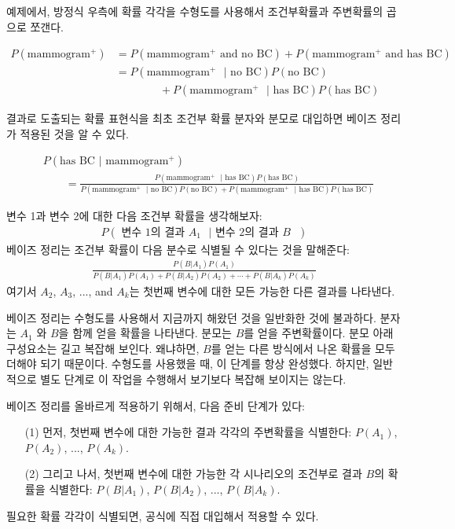 예제에서, 방정식 우측에 확률 각각을 수형도를 사용해서 조건부확률과 주변확률의 곱으로 쪼갠다.

\begin{align*}
P(\text{mammogram$^+$})
	&= P(\text{mammogram$^+$ and no BC}) + P(\text{mammogram$^+$ and has BC}) \\
	&= P(\text{mammogram$^+$ } | \text{ no BC})P(\text{no BC}) \\
			   &\qquad\qquad + P(\text{mammogram$^+$ } | \text{ has BC})P(\text{has BC})
\end{align*}

결과로 도출되는 확률 표현식을 최초 조건부 확률 분자와 분모로 대입하면 베이즈 정리가 적용된 것을 알 수 있다.

\begin{align*}
& P(\text{has BC } | \text{ mammogram$^+$})  \\
& \qquad= \frac{P(\text{mammogram$^+$ } | \text{ has BC})P(\text{has BC})}
	{P(\text{mammogram$^+$ } | \text{ no BC})P(\text{no BC}) + P(\text{mammogram$^+$ } | \text{ has BC})P(\text{has BC})}
\end{align*}

\begin{termBox}{
변수 1과 변수 2에 대한 다음 조건부 확률을 생각해보자:\vspace{-1.5mm}
\begin{align*}
P(\text{ 변수 1의 결과 $A_1$ } | \text{ 변수 2의 결과 $B$ })
\end{align*}
베이즈 정리는 조건부 확률이 다음 분수로 식별될 수 있다는 것을 말해준다:\vspace{-1.5mm}
\begin{align}
\frac{P(B | A_1) P(A_1)}
	{P(B | A_1) P(A_1) + P(B | A_2) P(A_2) + \cdots + P(B | A_k) P(A_k)}
	\label{equationOfBayesTheorem}
\end{align}
여기서 $A_2$, $A_3$, ..., and $A_k$는 첫번째 변수에 대한 모든 가능한 다른 결과를 나타낸다.}
\end{termBox}

베이즈 정리는 수형도를 사용해서 지금까지 해왔던 것을 일반화한 것에 불과하다.
분자는 $A_1$ 와 $B$을 함께 얻을 확률을 나타낸다. 분모는 $B$를 얻을 주변확률이다. 분모 아래 구성요소는 길고 복잡해 보인다. 왜냐하면, $B$를 얻는 다른 방식에서 나온 확률을 모두 더해야 되기 때문이다. 수형도를 사용했을 때, 이 단계를 항상 완성했다. 하지만, 일반적으로 별도 단계로 이 작업을 수행해서 보기보다 복잡해 보이지는 않는다.

베이즈 정리를 올바르게 적용하기 위해서, 다음 준비 단계가 있다:
\begin{enumerate}
\setlength{\itemsep}{0mm}
\item[(1)] 먼저, 첫번째 변수에 대한 가능한 결과 각각의 주변확률을 식별한다: $P(A_1)$, $P(A_2)$, ..., $P(A_k)$.
\item[(2)] 그리고 나서, 첫번째 변수에 대한 가능한 각 시나리오의 조건부로 결과 $B$의 확률을 식별한다: $P(B | A_1)$, $P(B | A_2)$, ..., $P(B | A_k)$.
\end{enumerate}
필요한 확률 각각이 식별되면, 공식에 직접 대입해서 적용할 수 있다.

